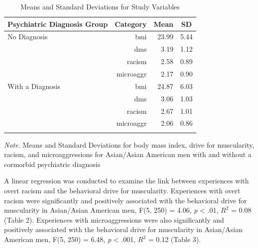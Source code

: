 \documentclass[
  english,
  man, fleqn, noextraspace,floatsintext]{apa6}
\begin{document}
\begin{table}[tbp]

\begin{center}
\begin{threeparttable}

\caption{\label{tab:table1}Means and Standard Deviations for Study Variables}

\begin{tabular}{lrrr}
\toprule
Psychiatric Diagnosis Group & \multicolumn{1}{c}{Category} & \multicolumn{1}{c}{Mean} & \multicolumn{1}{c}{SD}\\
\midrule
No Diagnosis & bmi & 23.99 & 5.44\\
 & dms & 3.19 & 1.12\\
 & racism & 2.58 & 0.89\\
 & microaggr & 2.17 & 0.90\\
With a Diagnosis & bmi & 24.87 & 6.03\\
 & dms & 3.06 & 1.03\\
 & racism & 2.67 & 1.01\\
 & microaggr & 2.06 & 0.86\\
\bottomrule
\addlinespace
\end{tabular}

\begin{tablenotes}[para]
\normalsize{\textit{Note.}  Means and Standard Deviations for body mass index, drive for muscularity, racism, and microaggressions for Asian/Asian American men with and without a cormorbid psychiatric diagnosis}
\end{tablenotes}

\end{threeparttable}
\end{center}

\end{table}

A linear regression was conducted to examine the link between experiences with overt racism and the behavioral drive for muscularity. Experiences with overt racism were significantly and positively associated with the behavioral drive for muscularity in Asian/Asian American men, F(5, 250) = 4.06, \emph{p} \textless{} .01, \(R^2\) = 0.08 (Table 2). Experiences with microaggressions were also significantly and positively associated with the behavioral drive for muscularity in Asian/Asian American men, F(5, 250) = 6.48, \emph{p} \textless{} .001, \(R^2\) = 0.12 (Table 3).
\end{document}
